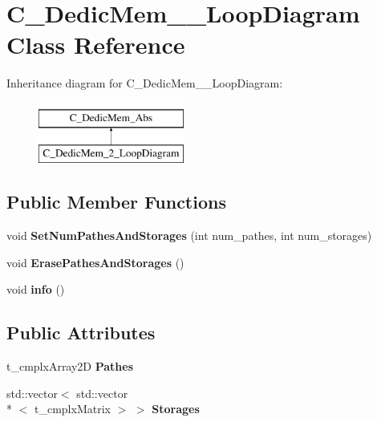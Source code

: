 \hypertarget{class_c___dedic_mem__2___loop_diagram}{\section{C\-\_\-\-Dedic\-Mem\-\_\-\_\-\-Loop\-Diagram Class Reference}
\label{class_c___dedic_mem__2___loop_diagram}
}
Inheritance diagram for C\-\_\-\-Dedic\-Mem\-\_\-\_\-\-Loop\-Diagram\-:\begin{figure}[H]
\begin{center}
\leavevmode
\includegraphics[height=2.000000cm]{class_c___dedic_mem__2___loop_diagram}
\end{center}
\end{figure}
\subsection*{Public Member Functions}
\begin{DoxyCompactItemize}
\item 
\hypertarget{class_c___dedic_mem__2___loop_diagram_a87c07ded9755407c88052d9de8d6cd3a}{void {\bfseries Set\-Num\-Pathes\-And\-Storages} (int num\-\_\-pathes, int num\-\_\-storages)}\label{class_c___dedic_mem__2___loop_diagram_a87c07ded9755407c88052d9de8d6cd3a}

\item 
\hypertarget{class_c___dedic_mem__2___loop_diagram_aa5a8d30171c1eb251a85faec0e734b06}{void {\bfseries Erase\-Pathes\-And\-Storages} ()}\label{class_c___dedic_mem__2___loop_diagram_aa5a8d30171c1eb251a85faec0e734b06}

\item 
\hypertarget{class_c___dedic_mem__2___loop_diagram_aab24dc42490cb4b0e2c7f44b40c9f153}{void {\bfseries info} ()}\label{class_c___dedic_mem__2___loop_diagram_aab24dc42490cb4b0e2c7f44b40c9f153}

\end{DoxyCompactItemize}
\subsection*{Public Attributes}
\begin{DoxyCompactItemize}
\item 
\hypertarget{class_c___dedic_mem__2___loop_diagram_ad11ed425618530c73905e450d8cc2afa}{t\-\_\-cmplx\-Array2\-D {\bfseries Pathes}}\label{class_c___dedic_mem__2___loop_diagram_ad11ed425618530c73905e450d8cc2afa}

\item 
\hypertarget{class_c___dedic_mem__2___loop_diagram_a058e1414d28d4ec7c4e224c72f27ead8}{std\-::vector$<$ std\-::vector\\*
$<$ t\-\_\-cmplx\-Matrix $>$ $>$ {\bfseries Storages}}\label{class_c___dedic_mem__2___loop_diagram_a058e1414d28d4ec7c4e224c72f27ead8}

\end{DoxyCompactItemize}


